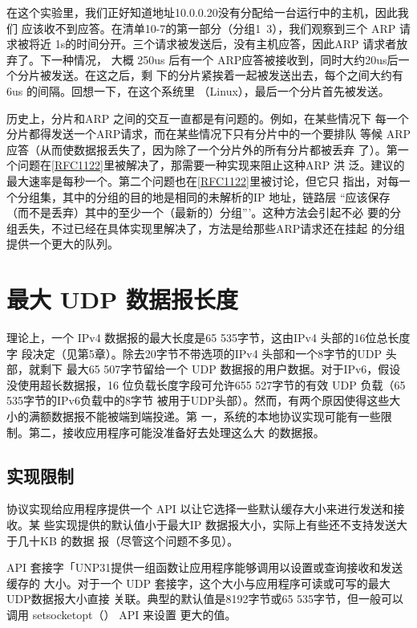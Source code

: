 在这个实验里，我们正好知道地址10.0.0.20没有分配给一台运行中的主机，因此我们
应该收不到应答。在清单10-7的第一部分（分组1~3），我们观察到三个 ARP 请求被将近
1s的时间分开。三个请求被发送后，没有主机应答，因此ARP 请求者放弃了。下一种情况，
大概 250us 后有一个 ARP应答被接收到，同时大约20us后一个分片被发送。在这之后，剩
下的分片紧挨着一起被发送出去，每个之间大约有6us 的间隔。回想一下，在这个系统里
（Linux），最后一个分片首先被发送。

\begin{tcolorbox}
    历史上，分片和ARP 之间的交互一直都是有问题的。例如，在某些情况下
    每一个分片都得发送一个ARP请求，而在某些情况下只有分片中的一个要排队
    等候 ARP应答（从而使数据报丢失了，因为除了一个分片外的所有分片都被丢弃
    了）。第一个问题在\href{https://www.rfc-editor.org/rfc/rfc1122}{[RFC1122]}里被解决了，那需要一种实现来阻止这种ARP 洪
    泛。建议的最大速率是每秒一个。第二个问题也在\href{https://www.rfc-editor.org/rfc/rfc1122}{[RFC1122]}里被讨论，但它只
    指出，对每一个分组集，其中的分组的目的地是相同的未解析的IP 地址，链路层
    “应该保存（而不是丢弃）其中的至少一个（最新的）分组”’。这种方法会引起不必
    要的分组丢失，不过已经在具体实现里解决了，方法是给那些ARP请求还在挂起
    的分组提供一个更大的队列。
\end{tcolorbox}

\section{最大 UDP 数据报长度}
理论上，一个 IPv4 数据报的最大长度是65 535字节，这由IPv4 头部的16位总长度字
段决定（见第5章）。除去20字节不带选项的IPv4 头部和一个8字节的UDP 头部，就剩下
最大65 507字节留给一个 UDP 数据报的用户数据。对于IPv6，假设没使用超长数据报，16
位负载长度字段可允许655 527字节的有效 UDP 负载（65 535字节的IPv6负载中的8字节
被用于UDP头部）。然而，有两个原因使得这些大小的满额数据报不能被端到端投递。第
一，系统的本地协议实现可能有一些限制。第二，接收应用程序可能没准备好去处理这么大
的数据报。

\subsection{实现限制}
协议实现给应用程序提供一个 API 以让它选择一些默认缓存大小来进行发送和接收。某
些实现提供的默认值小于最大IP 数据报大小，实际上有些还不支持发送大于几十KB 的数据
报（尽管这个问题不多见）。

API 套接字「UNP31提供一组函数让应用程序能够调用以设置或查询接收和发送缓存的
大小。对于一个 UDP 套接字，这个大小与应用程序可读或可写的最大 UDP数据报大小直接
关联。典型的默认值是8192字节或65 535字节，但一般可以调用 setsocketopt（） API 来设置
更大的值。

